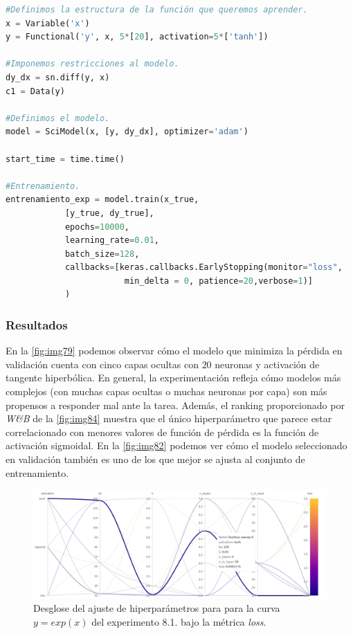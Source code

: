 \lstset{style=mystyle}


\begin{lstlisting}[language=Python,caption={Ejemplo de modelo en \textit{SciANN} para el ajuste de la función exponencial.},label={lst:exp1-exp}]
#Definimos la estructura de la función que queremos aprender.
x = Variable('x')
y = Functional('y', x, 5*[20], activation=5*['tanh'])

#Imponemos restricciones al modelo.
dy_dx = sn.diff(y, x)
c1 = Data(y)

#Definimos el modelo.
model = SciModel(x, [y, dy_dx], optimizer='adam')

start_time = time.time()

#Entrenamiento.
entrenamiento_exp = model.train(x_true,
            [y_true, dy_true],
            epochs=10000,
            learning_rate=0.01,
            batch_size=128,
            callbacks=[keras.callbacks.EarlyStopping(monitor="loss",
                        min_delta = 0, patience=20,verbose=1)]
            )
\end{lstlisting}



\subsubsection{Resultados}

En la \autoref{fig:img79} podemos observar cómo el modelo que minimiza la pérdida en validación cuenta con cinco capas ocultas con $20$ neuronas y activación de tangente hiperbólica. En general, la experimentación refleja cómo modelos más complejos (con muchas capas ocultas o muchas neuronas por capa) son más propensos a responder mal ante la tarea. Además, el ranking proporcionado por \textit{W\&B} de la \autoref{fig:img84} muestra que el único hiperparámetro que parece estar correlacionado con menores valores de función de pérdida es la función de activación sigmoidal. En la \autoref{fig:img82} podemos ver cómo el modelo seleccionado en validación también es uno de los que mejor se ajusta al conjunto de entrenamiento. 


\begin{figure}[htbp]
    \centering
    \includegraphics[width=1\textwidth]{img/img82.png}
    \caption{Desglose del ajuste de hiperparámetros para para la curva $y=exp(x)$ del experimento 8.1. bajo la métrica \textit{loss}.}
    \label{fig:img82}
\end{figure}

